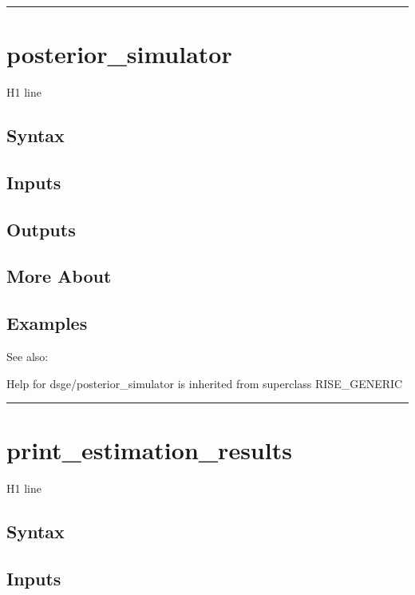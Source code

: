 \documentclass[letterpaper,10pt,english]{sphinxmanual}
\begin{document}
\bigskip\hrule{}\bigskip



\section{posterior\_simulator}
\label{classes/models/@dsge/dsge:posterior-simulator}\label{classes/models/@dsge/dsge:id136}
H1 line


\subsection{Syntax}
\label{classes/models/@dsge/dsge:id137}

\subsection{Inputs}
\label{classes/models/@dsge/dsge:id138}

\subsection{Outputs}
\label{classes/models/@dsge/dsge:id139}

\subsection{More About}
\label{classes/models/@dsge/dsge:id140}

\subsection{Examples}
\label{classes/models/@dsge/dsge:id141}
See also:

Help for dsge/posterior\_simulator is inherited from superclass RISE\_GENERIC


\bigskip\hrule{}\bigskip



\section{print\_estimation\_results}
\label{classes/models/@dsge/dsge:print-estimation-results}\label{classes/models/@dsge/dsge:id142}
H1 line


\subsection{Syntax}
\label{classes/models/@dsge/dsge:id143}

\subsection{Inputs}
\label{classes/models/@dsge/dsge:id144}
\end{document}
